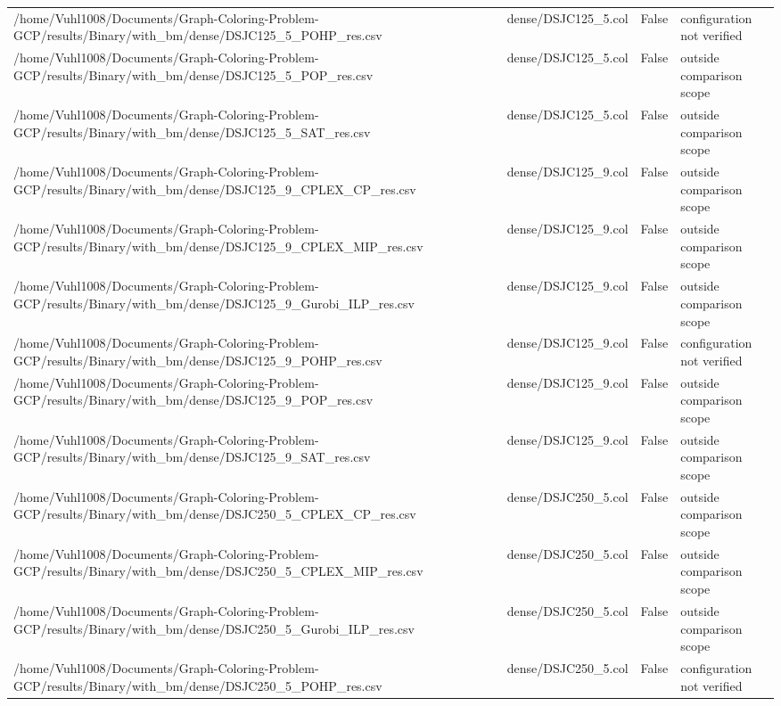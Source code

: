 \begin{table}[htbp]
\begin{tabular}{llll}
/home/Vuhl1008/Documents/Graph-Coloring-Problem-GCP/results/Binary/with\_bm/dense/DSJC125\_5\_POHP\_res.csv & dense/DSJC125\_5.col & False & configuration not verified \\
/home/Vuhl1008/Documents/Graph-Coloring-Problem-GCP/results/Binary/with\_bm/dense/DSJC125\_5\_POP\_res.csv & dense/DSJC125\_5.col & False & outside comparison scope \\
/home/Vuhl1008/Documents/Graph-Coloring-Problem-GCP/results/Binary/with\_bm/dense/DSJC125\_5\_SAT\_res.csv & dense/DSJC125\_5.col & False & outside comparison scope \\
/home/Vuhl1008/Documents/Graph-Coloring-Problem-GCP/results/Binary/with\_bm/dense/DSJC125\_9\_CPLEX\_CP\_res.csv & dense/DSJC125\_9.col & False & outside comparison scope \\
/home/Vuhl1008/Documents/Graph-Coloring-Problem-GCP/results/Binary/with\_bm/dense/DSJC125\_9\_CPLEX\_MIP\_res.csv & dense/DSJC125\_9.col & False & outside comparison scope \\
/home/Vuhl1008/Documents/Graph-Coloring-Problem-GCP/results/Binary/with\_bm/dense/DSJC125\_9\_Gurobi\_ILP\_res.csv & dense/DSJC125\_9.col & False & outside comparison scope \\
/home/Vuhl1008/Documents/Graph-Coloring-Problem-GCP/results/Binary/with\_bm/dense/DSJC125\_9\_POHP\_res.csv & dense/DSJC125\_9.col & False & configuration not verified \\
/home/Vuhl1008/Documents/Graph-Coloring-Problem-GCP/results/Binary/with\_bm/dense/DSJC125\_9\_POP\_res.csv & dense/DSJC125\_9.col & False & outside comparison scope \\
/home/Vuhl1008/Documents/Graph-Coloring-Problem-GCP/results/Binary/with\_bm/dense/DSJC125\_9\_SAT\_res.csv & dense/DSJC125\_9.col & False & outside comparison scope \\
/home/Vuhl1008/Documents/Graph-Coloring-Problem-GCP/results/Binary/with\_bm/dense/DSJC250\_5\_CPLEX\_CP\_res.csv & dense/DSJC250\_5.col & False & outside comparison scope \\
/home/Vuhl1008/Documents/Graph-Coloring-Problem-GCP/results/Binary/with\_bm/dense/DSJC250\_5\_CPLEX\_MIP\_res.csv & dense/DSJC250\_5.col & False & outside comparison scope \\
/home/Vuhl1008/Documents/Graph-Coloring-Problem-GCP/results/Binary/with\_bm/dense/DSJC250\_5\_Gurobi\_ILP\_res.csv & dense/DSJC250\_5.col & False & outside comparison scope \\
/home/Vuhl1008/Documents/Graph-Coloring-Problem-GCP/results/Binary/with\_bm/dense/DSJC250\_5\_POHP\_res.csv & dense/DSJC250\_5.col & False & configuration not verified \\

\end{tabular}
\end{table}
